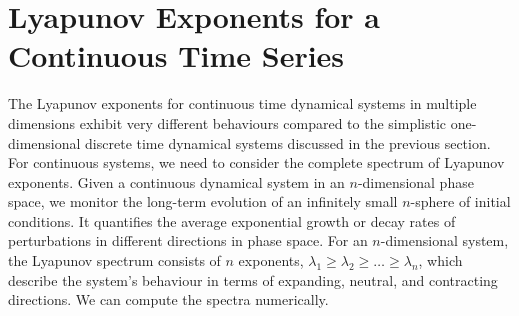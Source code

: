 \section{Lyapunov Exponents for a Continuous Time Series}\label{LyapCts}

The Lyapunov exponents for continuous time dynamical systems in multiple dimensions exhibit very different behaviours compared to the simplistic one-dimensional discrete time dynamical systems discussed in the previous section. 
For continuous systems, we need to consider the complete spectrum of Lyapunov exponents. 
Given a continuous dynamical system in an $n$-dimensional phase space, we monitor the long-term evolution of an infinitely small $n$-sphere of initial conditions. 
It quantifies the average exponential growth or decay rates of perturbations in different directions in phase space. 
For an $n$-dimensional system, the Lyapunov spectrum consists of $n$ exponents, $\lambda_1 \geq \lambda_2 \geq \dots \geq \lambda_n$, which describe the system's behaviour in terms of expanding, neutral, and contracting directions. We can compute the spectra numerically.

